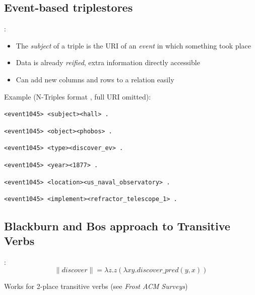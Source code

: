 \documentclass[logoontitle,tabu,supertabular,aspectratio=43]{preney-uwindsor-beamer}
\newcommand{\meaningof}[1]{\lVert #1 \rVert}
\newcommand{\wordpred}[1]{\mathit{#1\_pred}}
\newcommand{\discover}{\mathit{discover}}
\begin{document}
    \subsection{Event-based triplestores}
    \begin{frame}{\insertsection: \insertsubsection}
        \begin{itemize}
            \item The {\em subject} of a triple is the URI of an \textit{event} in which something took place
            \item Data is already {\em reified}, extra information directly accessible
            \item Can add new columns and rows to a relation easily
        \end{itemize}

        Example (N-Triples format \cite{w3cntriples}, full URI omitted):
        \begin{block}{}
            \hspace{5em}\texttt{<event1045> <subject>\phantom{qqq}<hall> .}

            \hspace{5em}\texttt{<event1045> <object>\phantom{qqqq}<phobos> .}

            \hspace{5em}\texttt{<event1045> <type>\phantom{qqqqqq}<discover\_ev> .}

            \hspace{5em}\texttt{<event1045> <year>\phantom{qqqqqq}<1877> .}

            \hspace{5em}\texttt{<event1045> <location>\phantom{qq}<us\_naval\_observatory> .}

            \hspace{5em}\texttt{<event1045> <implement>\phantom{q}<refractor\_telescope\_1> .}
        \end{block}

    \end{frame}

    \subsection{Blackburn and Bos approach to Transitive Verbs}
    \begin{frame}{\insertsection: \insertsubsection}
        \begin{equation*}
            \meaningof{discover} = \lambda z. z(\lambda xy. \wordpred{\discover}(y, x))
        \end{equation*}

        \centering
        Works for 2-place transitive verbs (see \textit{Frost ACM Surveys}\cite{frost2006realization})
    \end{frame}
\end{document}
